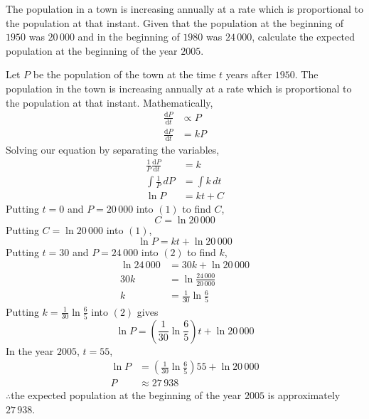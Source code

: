 \documentclass[11pt,a4paper]{book}
\begin{document}
\begin{example}

The population in a town is increasing annually at a rate which is
proportional to the population at that instant. Given that the population
at the beginning of $1950$ was $20\,000$ and in the beginning of
$1980$ was $24\,000$, calculate the expected population at the beginning
of the year $2005$.

\Solution

Let $P$ be the population of the town at the time $t$ years after
$1950$. The population in the town is increasing annually at a rate
which is proportional to the population at that instant. Mathematically,
\begin{align*}
\frac{\mathrm{d}P}{\mathrm{d}t} & \propto P\\
\frac{\mathrm{d}P}{\mathrm{d}t} & =kP
\end{align*}
Solving our equation by separating the variables,
\begin{align*}
\frac{1}{P}\frac{\mathrm{d}P}{\mathrm{d}t} & =k\\
\int\frac{1}{P}\,dP & =\int k\,dt\\
\ln P & =kt+C\tag{1}
\end{align*}
Putting $t=0$ and $P=20\,000$ into $\left(1\right)$ to find $C$,
\[
C=\ln20\,000
\]
Putting $C=\ln20\,000$ into $\left(1\right)$,
\[
\ln P=kt+\ln20\,000\tag{2}
\]
Putting $t=30$ and $P=24\,000$ into $\left(2\right)$ to find $k$,
\begin{align*}
\ln24\,000 & =30k+\ln20\,000\\
30k & =\ln\frac{24\,000}{20\,000}\\
k & =\frac{1}{30}\ln\frac{6}{5}
\end{align*}
Putting ${\displaystyle k=\frac{1}{30}\ln\frac{6}{5}}$ into $\left(2\right)$
gives
\[
\ln P=\left(\frac{1}{30}\ln\frac{6}{5}\right)t+\ln20\,000
\]
In the year $2005$, $t=55$,
\begin{align*}
\ln P & =\left(\frac{1}{30}\ln\frac{6}{5}\right)55+\ln20\,000\\
P & \approx27\,938
\end{align*}
$\therefore$the expected population at the beginning of the year
$2005$ is approximately $27\,938$.

\end{example}

\newpage
\end{document}
